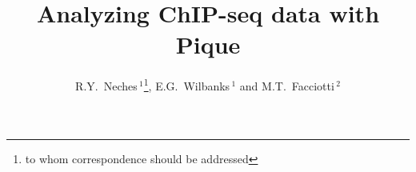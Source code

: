 \documentclass{bioinfo}
\begin{document}

\title[In a fit of pique]{Analyzing ChIP-seq data with Pique}
\author[Neches \textit{et~al}]{R.Y.~Neches\,$^{1}$\footnote{to whom
    correspondence should be addressed}, E.G.~Wilbanks\,$^{1}$ and
  M.T.~Facciotti\,$^2$}
\address{$^{1}$Microbiology Graduate Group, University of California, Davis.\\
  $^{2}$Department of Biomedical Engineering, University of
  California, Davis.}



\maketitle

\end{document}
